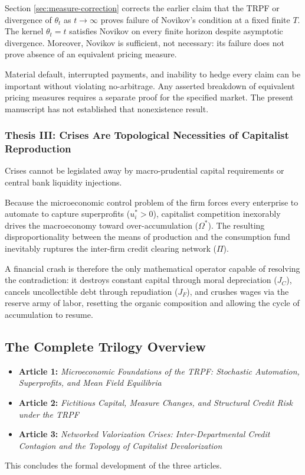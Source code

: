 \documentclass[11pt,letterpaper]{report}
\begin{document}
Section \ref{sec:measure-correction} corrects the earlier claim that the
TRPF or divergence of $\theta_t$ as $t\to\infty$ proves failure of
Novikov's condition at a fixed finite $T$. The kernel $\theta_t=t$
satisfies Novikov on every finite horizon despite asymptotic divergence.
Moreover, Novikov is sufficient, not necessary: its failure does not
prove absence of an equivalent pricing measure.

Material default, interrupted payments, and inability to hedge every
claim can be important without violating no-arbitrage. Any asserted
breakdown of equivalent pricing measures requires a separate proof for
the specified market. The present manuscript has not established that
nonexistence result.

\subsubsection{Thesis III: Crises Are Topological Necessities of Capitalist Reproduction}
Crises cannot be legislated away by macro-prudential capital requirements or central bank liquidity injections.

Because the microeconomic control problem of the firm forces every enterprise to automate to capture superprofits (${u}_{i}^{*}>0$), capitalist competition inexorably drives the macroeconomy toward over-accumulation (${\Omega }^{*}$). The resulting disproportionality between the means of production and the consumption fund inevitably ruptures the inter-firm credit clearing network ($\Pi$).

A financial crash is therefore the only mathematical operator capable of resolving the contradiction: it destroys constant capital through moral depreciation (${J}_{C}$), cancels uncollectible debt through repudiation (${J}_{F}$), and crushes wages via the reserve army of labor, resetting the organic composition and allowing the cycle of accumulation to resume.

\subsection{The Complete Trilogy Overview}
\begin{itemize}
\item \textbf{Article 1:} \emph{Microeconomic Foundations of the TRPF: Stochastic Automation, Superprofits, and Mean Field Equilibria}
\item \textbf{Article 2:} \emph{Fictitious Capital, Measure Changes, and Structural Credit Risk under the TRPF}
\item \textbf{Article 3:} \emph{Networked Valorization Crises: Inter-Departmental Credit Contagion and the Topology of Capitalist Devalorization}
\end{itemize}
This concludes the formal development of the three articles.
\end{document}
